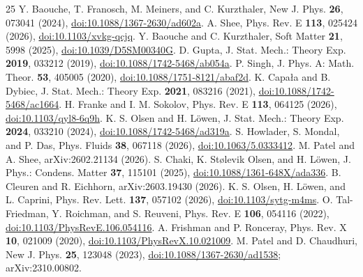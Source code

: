 \documentclass[aps,pre,amsmath,amssymb,nofootinbib]{revtex4-2}
\begin{document}
\begin{thebibliography}{25}
 Y. Baouche, T. Franosch, M. Meiners, and C. Kurzthaler, New J. Phys. \textbf{26}, 073041 (2024), \href{https://doi.org/10.1088/1367-2630/ad602a}{doi:10.1088/1367-2630/ad602a}.
 A. Shee, Phys. Rev. E \textbf{113}, 025424 (2026), \href{https://doi.org/10.1103/xvkg-qcjq}{doi:10.1103/xvkg-qcjq}.
 Y. Baouche and C. Kurzthaler, Soft Matter \textbf{21}, 5998 (2025), \href{https://doi.org/10.1039/D5SM00340G}{doi:10.1039/D5SM00340G}.
 D. Gupta, J. Stat. Mech.: Theory Exp. \textbf{2019}, 033212 (2019), \href{https://doi.org/10.1088/1742-5468/ab054a}{doi:10.1088/1742-5468/ab054a}.
 P. Singh, J. Phys. A: Math. Theor. \textbf{53}, 405005 (2020), \href{https://doi.org/10.1088/1751-8121/abaf2d}{doi:10.1088/1751-8121/abaf2d}.
 K. Capa{\l}a and B. Dybiec, J. Stat. Mech.: Theory Exp. \textbf{2021}, 083216 (2021), \href{https://doi.org/10.1088/1742-5468/ac1664}{doi:10.1088/1742-5468/ac1664}.
 H. Franke and I. M. Sokolov, Phys. Rev. E \textbf{113}, 064125 (2026), \href{https://doi.org/10.1103/qyl8-6q9h}{doi:10.1103/qyl8-6q9h}.
 K. S. Olsen and H. L\"owen, J. Stat. Mech.: Theory Exp. \textbf{2024}, 033210 (2024), \href{https://doi.org/10.1088/1742-5468/ad319a}{doi:10.1088/1742-5468/ad319a}.
 S. Howlader, S. Mondal, and P. Das, Phys. Fluids \textbf{38}, 067118 (2026), \href{https://doi.org/10.1063/5.0333412}{doi:10.1063/5.0333412}.
 M. Patel and A. Shee, arXiv:2602.21134 (2026).
 S. Chaki, K. St{\o}levik Olsen, and H. L\"owen, J. Phys.: Condens. Matter \textbf{37}, 115101 (2025), \href{https://doi.org/10.1088/1361-648X/ada336}{doi:10.1088/1361-648X/ada336}.
 B. Cleuren and R. Eichhorn, arXiv:2603.19430 (2026).
 K. S. Olsen, H. L\"owen, and L. Caprini, Phys. Rev. Lett. \textbf{137}, 057102 (2026), \href{https://doi.org/10.1103/sytg-m4ms}{doi:10.1103/sytg-m4ms}.
 O. Tal-Friedman, Y. Roichman, and S. Reuveni, Phys. Rev. E \textbf{106}, 054116 (2022), \href{https://doi.org/10.1103/PhysRevE.106.054116}{doi:10.1103/PhysRevE.106.054116}.
 A. Frishman and P. Ronceray, Phys. Rev. X \textbf{10}, 021009 (2020), \href{https://doi.org/10.1103/PhysRevX.10.021009}{doi:10.1103/PhysRevX.10.021009}.
 M. Patel and D. Chaudhuri, New J. Phys. \textbf{25}, 123048 (2023), \href{https://doi.org/10.1088/1367-2630/ad1538}{doi:10.1088/1367-2630/ad1538}; arXiv:2310.00802.
\end{thebibliography}
\end{document}

